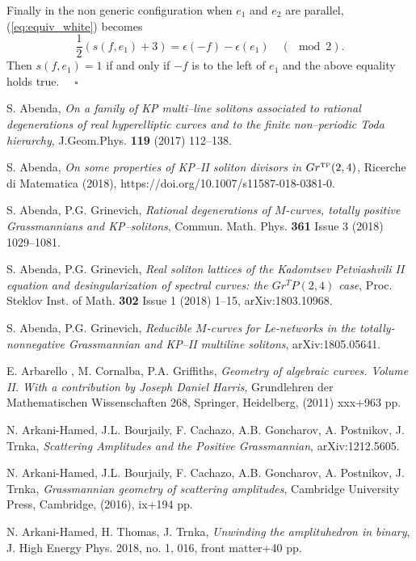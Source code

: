 \documentclass[11pt]{amsart}
\theoremstyle{plain}
\numberwithin{equation}{section}
\begin{document}
Finally in the non generic configuration when $e_1$ and $e_2$ are parallel, (\ref{eq:equiv_white}) becomes
\[
\frac{1}{2} \left( s(f,e_1) + 3\right) = \epsilon(-f) - \epsilon (e_1) \quad (\!\!\!\!\!\!\mod 2).
\]
Then $s(f,e_1)=1$ if and only if $-f$ is to the left of $e_1$ and the above equality holds true. $\quad \square$




\begin{thebibliography}{111}

 S. Abenda, {\em On a family of KP multi--line solitons associated to rational degenerations of real hyperelliptic curves and to the finite non--periodic Toda hierarchy}, J.Geom.Phys. {\bf 119} (2017) 112--138.

 S. Abenda, {\em On some properties of KP--II soliton divisors in $Gr^{\mbox{\tiny TP}}(2,4)$}, Ricerche di Matematica (2018), https://doi.org/10.1007/s11587-018-0381-0.

 S. Abenda, P.G. Grinevich, {\em Rational degenerations of $M$-curves, totally positive Grassmannians and KP--solitons}, Commun. Math. Phys. {\bf 361} Issue 3 (2018) 1029--1081.

 S. Abenda, P.G. Grinevich, {\em Real soliton lattices of the Kadomtsev Petviashvili II equation and desingularization of spectral curves: the $Gr^TP(2, 4)$ case}, Proc. Steklov Inst. of Math. {\bf 302} Issue 1 (2018) 1--15, arXiv:1803.10968.

 S. Abenda, P.G. Grinevich, {\em Reducible $M$-curves for Le-networks in the totally-nonnegative Grassmannian and KP--II multiline solitons}, arXiv:1805.05641.

  E. Arbarello , M. Cornalba,  P.A. Griffiths, {\em Geometry of algebraic curves. Volume II. With a contribution by Joseph Daniel Harris}, Grundlehren der Mathematischen Wissenschaften  268, Springer, Heidelberg, (2011) xxx+963 pp.

 N. Arkani-Hamed, J.L. Bourjaily, F. Cachazo, A.B. Goncharov, A. Postnikov, J. Trnka, {\em Scattering Amplitudes and the Positive Grassmannian}, arXiv:1212.5605.

 N. Arkani-Hamed, J.L. Bourjaily, F. Cachazo, A.B. Goncharov, A. Postnikov, J. Trnka, {\em Grassmannian geometry of scattering amplitudes}, Cambridge University Press, Cambridge, (2016), ix+194 pp.

 N. Arkani-Hamed, H. Thomas, J. Trnka, {\em Unwinding the amplituhedron in binary}, J. High Energy Phys. 2018, no. 1, 016, front matter+40 pp.


\end{thebibliography}
\end{document}
